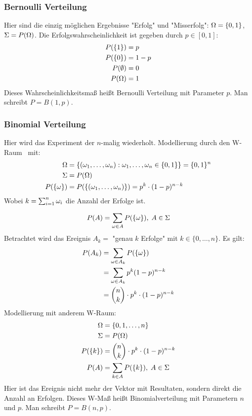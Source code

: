 \subsubsection{Bernoulli Verteilung}
\label{sec:bernoulli}
Hier sind die einzig möglichen Ergebnisse "Erfolg" und "Misserfolg":
$\Omega = \{ 0,1 \}$, $\Sigma = P(\Omega)$.
Die Erfolgswahrscheinlichkeit ist gegeben durch $p \in [0,1]$:
\begin{align*}
    P(\{1\})     & = p   \\
    P(\{0\})     & = 1-p \\
    P(\emptyset) & = 0   \\
    P(\Omega)       & = 1
\end{align*}
Dieses Wahrscheinlichkeitsmaß heißt Bernoulli Verteilung mit Parameter $p$.
Man schreibt $P=B(1,p)$.

\subsubsection{Binomial Verteilung}
Hier wird das Experiment der  $n$-malig wiederholt.
Modellierung durch den W-Raum \wraum\ mit:
\begin{align*}
    \Omega       & = \left\{ (\omega_1, \dots , \omega_n): \omega_1, \dots , \omega_n \in \{0,1\} \right\} = \{0,1\}^n \\
    \Sigma       & = P(\Omega)                                                                            \\
    P(\{\omega\}) & = P(\{(\omega_1, \dots , \omega_n)\}) = p^k \cdot (1-p)^{n-k}
\end{align*}
Wobei $k=\sum_{i=1}^n \omega_i$ die Anzahl der Erfolge ist.

\begin{equation*}
    P(A) = \sum_{\omega \in A} P(\{\omega\}), \; A \in \Sigma
\end{equation*}
Betrachtet wird das Ereignis $A_k =$ "genau $k$ Erfolge" mit $k \in \{0, \dots , n\}$.
Es gilt:
\begin{align*}
    P(A_k) & = \sum_{\omega \in A_k} P(\{ \omega \})            \\
           & = \sum_{\omega \in A_k} p^k (1-p)^{n-k}        \\
           & = \binom{n}{k} \cdot p^k \cdot (1-p)^{n-k}
\end{align*}
Modellierung mit anderem W-Raum:
\begin{align*}
    \Omega      & = \{0,1,\dots ,n\}                         \\
    \Sigma      & = P(\Omega)                                   \\
    P(\{k\}) & = \binom{n}{k} \cdot p^k \cdot (1-p)^{n-k} \\
    P(A)     & = \sum_{k \in A} P(\{k\}), \; A \in \Sigma
\end{align*}
Hier ist das Ereignis nicht mehr der Vektor mit Resultaten,
sondern direkt die Anzahl an Erfolgen.
Dieses W-Maß heißt Binomialverteilung mit Parametern $n$ und $p$.
Man schreibt $P = B(n,p)$.

